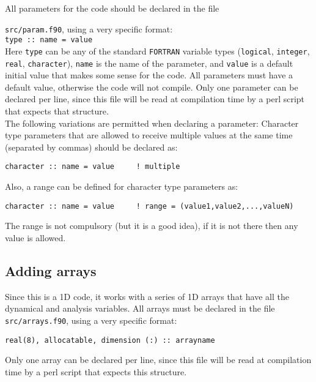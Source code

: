 \documentclass[12pt]{article}
\begin{document}
All parameters for the code should be declared in the file
{\texttt{src/param.f90}, using a very specific format: \\

\texttt{type :: name = value} \\

Here \texttt{type} can be any of the standard \texttt{FORTRAN}
variable types (\texttt{logical}, \texttt{integer}, \texttt{real},
\texttt{character}), \texttt{name} is the name of the parameter, and
\texttt{value} is a default initial value that makes some sense for
the code.  All parameters must have a default value, otherwise the
code will not compile. Only one parameter can be declared per line,
since this file will be read at compilation time by a perl script that
expects that structure. \\

The following variations are permitted when declaring a parameter:
Character type parameters that are allowed to receive multiple values
at the same time (separated by commas) should be declared as:

\begin{verbatim}
character :: name = value     ! multiple
\end{verbatim}}

Also, a range can be defined for character type parameters as:

\begin{verbatim}
character :: name = value     ! range = (value1,value2,...,valueN)
\end{verbatim}

The range is not compulsory (but it is a good idea), if it is not
there then any value is allowed.


\subsection{Adding arrays}

Since this is a 1D code, it works with a series of 1D arrays that have
all the dynamical and analysis variables. All arrays must be declared
in the file \texttt{src/arrays.f90}, using a very specific format:

\begin{verbatim}
real(8), allocatable, dimension (:) :: arrayname
\end{verbatim}

Only one array can be declared per line, since this file will be read
at compilation time by a perl script that expects this structure. \\
\end{document}
